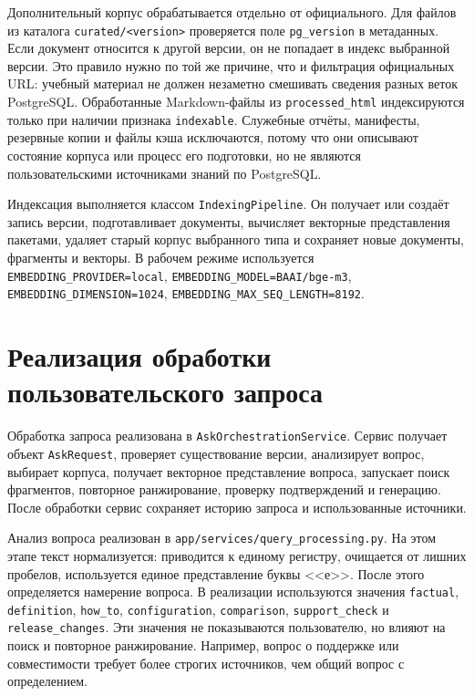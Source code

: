Дополнительный корпус обрабатывается отдельно от официального. Для файлов из каталога \texttt{curated/<version>} проверяется поле \texttt{pg\_version} в метаданных. Если документ относится к другой версии, он не попадает в индекс выбранной версии. Это правило нужно по той же причине, что и фильтрация официальных URL: учебный материал не должен незаметно смешивать сведения разных веток PostgreSQL. Обработанные Markdown-файлы из \texttt{processed\_html} индексируются только при наличии признака \texttt{indexable}. Служебные отчёты, манифесты, резервные копии и файлы кэша исключаются, потому что они описывают состояние корпуса или процесс его подготовки, но не являются пользовательскими источниками знаний по PostgreSQL.

Индексация выполняется классом \texttt{IndexingPipeline}. Он получает или создаёт запись версии, подготавливает документы, вычисляет векторные представления пакетами, удаляет старый корпус выбранного типа и сохраняет новые документы, фрагменты и векторы. В рабочем режиме используется \texttt{EMBEDDING\_PROVIDER=local}, \texttt{EMBEDDING\_MODEL=BAAI/bge-m3}, \texttt{EMBEDDING\_DIMENSION=1024}, \texttt{EMBEDDING\_MAX\_SEQ\_LENGTH=8192}.

\section{Реализация обработки пользовательского запроса}

Обработка запроса реализована в \texttt{AskOrchestrationService}. Сервис получает объект \texttt{AskRequest}, проверяет существование версии, анализирует вопрос, выбирает корпуса, получает векторное представление вопроса, запускает поиск фрагментов, повторное ранжирование, проверку подтверждений и генерацию. После обработки сервис сохраняет историю запроса и использованные источники.

Анализ вопроса реализован в \texttt{app/services/query\_processing.py}. На этом этапе текст нормализуется: приводится к единому регистру, очищается от лишних пробелов, используется единое представление буквы <<е>>. После этого определяется намерение вопроса. В реализации используются значения \texttt{factual}, \texttt{definition}, \texttt{how\_to}, \texttt{configuration}, \texttt{comparison}, \texttt{support\_check} и \texttt{release\_changes}. Эти значения не показываются пользователю, но влияют на поиск и повторное ранжирование. Например, вопрос о поддержке или совместимости требует более строгих источников, чем общий вопрос с определением.

